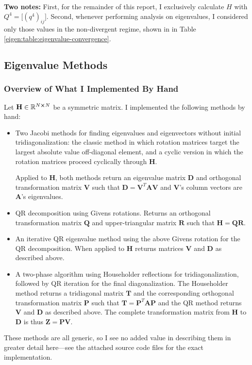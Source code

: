 \documentclass[11pt, a4paper]{article}
\newcommand{\mat}[1]{\mathbf{#1}}
\begin{document}
\textbf{Two notes:} First, for the remainder of this report, I exclusively calculate $ H $ with $ Q^{4} = \big[(q^{4})_{ij}\big] $. Second, whenever performing analysis on eigenvalues, I considered only those values in the non-divergent regime, shown in in Table \ref{eigen:table:eigenvalue-convergence}.


\subsection{Eigenvalue Methods}


\subsubsection{Overview of What I Implemented By Hand} \label{eigen:sss:methods-by-hand}
Let $ \mat{H} \in \mathbb{R}^{N\cross N} $ be a symmetric matrix. I implemented the following methods by hand:
\begin{itemize}
	\item Two Jacobi methods for finding eigenvalues and eigenvectors without initial tridiagonalization: the classic method in which rotation matrices target the largest absolute value off-diagonal element, and a cyclic version in which the rotation matrices proceed cyclically through $ \mat{H} $.
	
	Applied to $ \mat{H} $, both methods return an eigenvalue matrix $ \mat{D} $ and orthogonal transformation matrix $ \mat{V} $ such that $ \mat{D} = \mat{V}^{T}\mat{A}\mat{V} $ and $ \mat{V} $'s column vectors are $ \mat{A} $'s eigenvalues.
	
	\item QR decomposition using Givens rotations. Returns an orthogonal transformation matrix $ \mat{Q} $ and upper-triangular matrix $ \mat{R} $ such that $ \mat{H} = \mat{Q}\mat{R} $. 
	
	\item An iterative QR eigenvalue method using the above Givens rotation for the QR decomposition. When applied to $ \mat{H} $ returns matrices $ \mat{V} $ and $ \mat{D} $ as described above.

	\item A two-phase algorithm using Householder reflections for tridiagonalization, followed by QR iteration for the final diagonalization. The Householder method returns a tridiagonal matrix $ \mat{T} $ and the corresponding orthogonal transformation matrix $ \mat{P} $ such that $ \mat{T} = \mat{P}^{T}\mat{A}\mat{P} $ and the QR method returns $ \mat{V} $ and $ \mat{D} $ as described above. The complete transformation matrix from $ \mat{H} $ to $ \mat{D} $ is thus $ \mat{Z} = \mat{P}\mat{V} $. 

\end{itemize}
These methods are all generic, so I see no added value in describing them in greater detail here---see the attached source code files for the exact implementation. 
\end{document}
